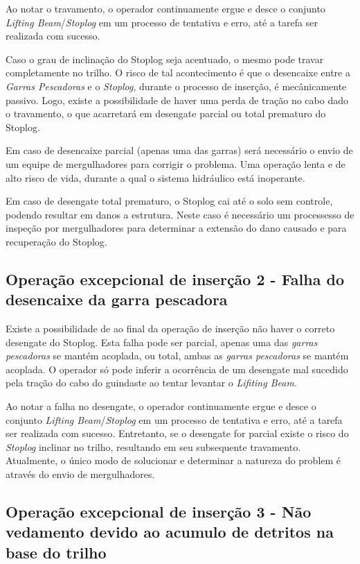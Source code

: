 Ao notar o travamento, o operador continuamente ergue e desce o
conjunto \emph{Lifting Beam}/\emph{Stoplog} em um 
processo de tentativa e erro, até a tarefa ser realizada com
sucesso.

Caso o grau de inclinação do Stoplog seja acentuado, o mesmo pode travar completamente no trilho. O risco de tal acontecimento é que o desencaixe entre a \emph{Garras Pescadoras} e o \emph{Stoplog}, durante o processo de inserção, é  mecânicamente passivo. Logo, existe a possibilidade de haver uma perda de tração no cabo dado o travamento, o que acarretará em desengate parcial ou total prematuro do Stoplog. 

Em caso de desencaixe parcial (apenas uma das
garras) será necessário o envio de um equipe de mergulhadores para corrigir o problema. Uma operação lenta e de alto risco de vida, durante a qual o sistema hidráulico está inoperante. 

Em caso de desengate total prematuro, o Stoplog cai até o solo sem controle, podendo resultar em danos a estrutura. Neste caso é necessário um processesso de inspeção por mergulhadores para determinar a extensão do dano causado e para recuperação do Stoplog. 




\subsection{Operação excepcional de inserção 2 - Falha do desencaixe da garra pescadora}
\label{op:ins:2}

Existe a possibilidade de ao final da operação de inserção não haver o correto desengate do Stoplog. Esta falha pode ser parcial, apenas uma das \emph{garras pescadoras} se mantém acoplada, ou total, ambas as \emph{garras pescadoras} se mantém acoplada. O operador só pode inferir a ocorrência de um desengate mal sucedido pela tração do cabo do guindaste ao tentar levantar o \emph{Lifiting Beam}.

Ao notar a falha no desengate, o operador continuamente ergue e desce o
conjunto \emph{Lifting Beam}/\emph{Stoplog} em um 
processo de tentativa e erro, até a tarefa ser realizada com sucesso. Entretanto, se o desengate for parcial existe o risco do \emph{Stoplog} inclinar no trilho, resultando em seu subsequente travamento. Atualmente, o único modo de solucionar e determinar a natureza do problem é através do envio de mergulhadores. 

\subsection{Operação excepcional de inserção 3 - Não vedamento devido ao acumulo de detritos na base do trilho}


